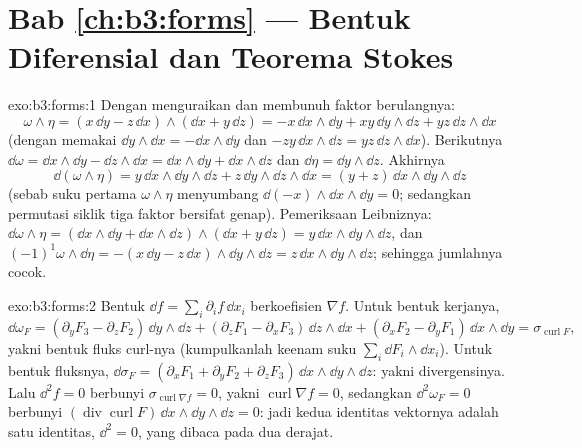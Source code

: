 \section*{Bab \ref{ch:b3:forms} --- Bentuk Diferensial dan
Teorema Stokes}

\begin{solution}{exo:b3:forms:1}
Dengan menguraikan dan membunuh faktor berulangnya:
\[
\omega\wedge\eta = (x\,\dd y - z\,\dd x)\wedge(\dd x +
y\,\dd z)
= -x\,\dd x\wedge\dd y + xy\,\dd y\wedge\dd z +
yz\,\dd z\wedge\dd x
\]
(dengan memakai $\dd y\wedge\dd x = -\dd x\wedge\dd y$ dan $-zy\,\dd
x\wedge\dd z = yz\,\dd z\wedge\dd x$). Berikutnya $\dd\omega =
\dd x\wedge\dd y - \dd z\wedge\dd x = \dd x\wedge\dd y +
\dd x\wedge\dd z$ dan $\dd\eta = \dd y\wedge\dd z$. Akhirnya
\[
\dd(\omega\wedge\eta) = y\,\dd x\wedge\dd y\wedge\dd z +
z\,\dd y\wedge\dd z\wedge\dd x = (y + z)\,\dd x\wedge\dd
y\wedge\dd z
\]
(sebab suku pertama $\omega\wedge\eta$ menyumbang $\dd(-x)
\wedge\dd x\wedge\dd y = 0$; sedangkan permutasi siklik tiga
faktor bersifat genap). Pemeriksaan Leibniznya: $\dd\omega\wedge\eta =
(\dd x\wedge\dd y + \dd x\wedge\dd z)\wedge(\dd x + y\,\dd
z) = y\,\dd x\wedge\dd y\wedge\dd z$, dan
$(-1)^1\omega\wedge\dd\eta = -(x\,\dd y - z\,\dd
x)\wedge\dd y\wedge\dd z = z\,\dd x\wedge\dd y\wedge\dd z$;
sehingga jumlahnya cocok.
\end{solution}

\begin{solution}{exo:b3:forms:2}
Bentuk $\dd f = \sum_i\partial_if\,\dd x_i$ berkoefisien
$\nabla f$. Untuk bentuk kerjanya,
\[
\dd\omega_F = (\partial_yF_3 - \partial_zF_2)\,\dd y\wedge\dd
z + (\partial_zF_1 - \partial_xF_3)\,\dd z\wedge\dd x +
(\partial_xF_2 - \partial_yF_1)\,\dd x\wedge\dd y =
\sigma_{\operatorname{curl}F},
\]
yakni bentuk fluks curl-nya (kumpulkanlah keenam suku
$\sum_i\dd F_i\wedge\dd x_i$). Untuk bentuk fluksnya,
$\dd\sigma_F = (\partial_xF_1 + \partial_yF_2 +
\partial_zF_3)\,\dd x\wedge\dd y\wedge\dd z$: yakni
divergensinya. Lalu $\dd^2f = 0$ berbunyi
$\sigma_{\operatorname{curl}\nabla f} = 0$, yakni
$\operatorname{curl}\nabla f = 0$, sedangkan $\dd^2\omega_F = 0$
berbunyi $(\operatorname{div}\operatorname{curl}F)\,\dd
x\wedge\dd y\wedge\dd z = 0$: jadi kedua identitas vektornya adalah
satu identitas, $\dd^2 = 0$, yang dibaca pada dua derajat.
\end{solution}


